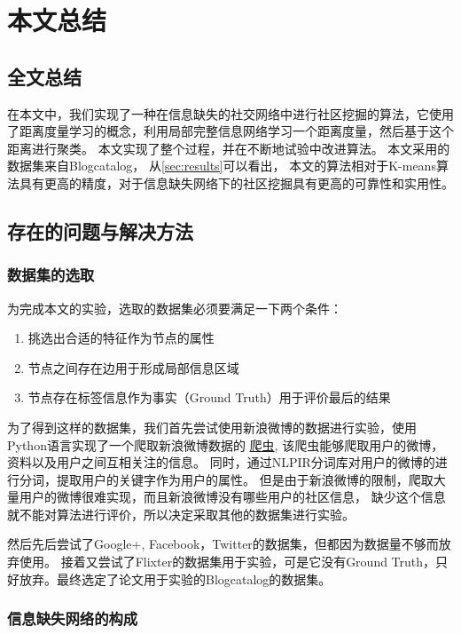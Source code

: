 \chapter{本文总结}
\label{chap:summary}

\section{全文总结}

在本文中，我们实现了一种在信息缺失的社交网络中进行社区挖掘的算法，它使用了距离度量学习的概念，利用局部完整信息网络学习一个距离度量，然后基于这个距离进行聚类。
本文实现了整个过程，并在不断地试验中改进算法。
本文采用的数据集来自Blogcatalog，
从\ref{sec:results}可以看出， 本文的算法相对于K-means算法具有更高的精度，对于信息缺失网络下的社区挖掘具有更高的可靠性和实用性。

\section{存在的问题与解决方法}

\subsection{数据集的选取}

为完成本文的实验，选取的数据集必须要满足一下两个条件：

\begin{enumerate}
\item 挑选出合适的特征作为节点的属性
\item 节点之间存在边用于形成局部信息区域
\item 节点存在标签信息作为事实（Ground Truth）用于评价最后的结果
\end{enumerate}

为了得到这样的数据集，我们首先尝试使用新浪微博的数据进行实验，使用Python语言实现了一个爬取新浪微博数据的
\href{https://github.com/chouqin/weibo-crawler}{爬虫},
该爬虫能够爬取用户的微博，资料以及用户之间互相关注的信息。
同时，通过NLPIR分词库对用户的微博的进行分词，提取用户的关键字作为用户的属性。
但是由于新浪微博的限制，爬取大量用户的微博很难实现，而且新浪微博没有哪些用户的社区信息，
缺少这个信息就不能对算法进行评价，所以决定采取其他的数据集进行实验。

然后先后尝试了Google+, Facebook，Twitter的数据集，但都因为数据量不够而放弃使用。
接着又尝试了Flixter的数据集用于实验，可是它没有Ground Truth，只好放弃。最终选定了论文用于实验的Blogcatalog的数据集。

\subsection{信息缺失网络的构成}

